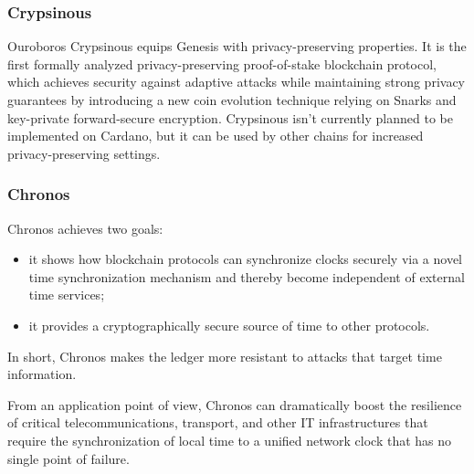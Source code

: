 \vspace{0.5cm}

\subsubsection{Crypsinous}

Ouroboros Crypsinous equips Genesis with privacy-preserving properties. It is 
the first formally analyzed privacy-preserving proof-of-stake blockchain protocol, 
which achieves security against adaptive attacks while maintaining strong 
privacy guarantees by introducing a new coin evolution technique relying on 
Snarks and key-private forward-secure encryption. Crypsinous isn't currently 
planned to be implemented on Cardano, but it can be used by other chains for 
increased privacy-preserving settings.

\vspace{0.5cm}

\subsubsection{Chronos}

Chronos achieves two goals: 
\begin{itemize}
    \item it shows how blockchain protocols can synchronize clocks securely via 
        a novel time synchronization mechanism and thereby become independent of 
        external time services;
    \item it provides a cryptographically secure source of time to other protocols.
\end{itemize}
In short, Chronos makes the ledger more resistant to attacks that target time 
information.

\vspace{0.2cm}

\noindent
From an application point of view, Chronos can dramatically boost the resilience 
of critical telecommunications, transport, and other IT infrastructures that require 
the synchronization of local time to a unified network clock that has no single 
point of failure.